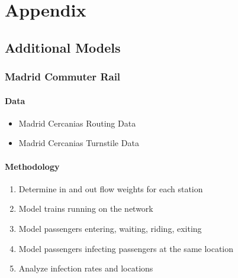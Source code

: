 \documentclass[12pt, a4, epsf] {article}
\theoremstyle{plain}
\theoremstyle{definition}
\begin{document}
\section{Appendix}
\subsection{Additional Models}
\subsubsection{Madrid Commuter Rail}
\paragraph{Data}
\begin{itemize}
    \item Madrid Cercanias Routing Data \cite{Madrid_Cercanias_Routing_Data}
    \item Madrid Cercanias Turnstile Data \cite{Madrid_Cercanias_Turnstile_Data}
\end{itemize}
\paragraph{Methodology}
\begin{enumerate}
    \item Determine in and out flow weights for each station
    \item Model trains running on the network
    \item Model passengers entering, waiting, riding, exiting
    \item Model passengers infecting passengers at the same location
    \item Analyze infection rates and locations
\end{enumerate}
\end{document}
